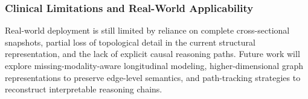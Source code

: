 \documentclass[lettersize,journal]{IEEEtran}
\begin{document}
\subsubsection{Clinical Limitations and Real-World Applicability}

Real-world deployment is still limited by reliance on complete cross-sectional snapshots, partial loss of topological detail in the current structural representation, and the lack of explicit causal reasoning paths. Future work will explore missing-modality-aware longitudinal modeling, higher-dimensional graph representations to preserve edge-level semantics, and path-tracking strategies to reconstruct interpretable reasoning chains.


	




    

	
	







\vfill
\end{document}

